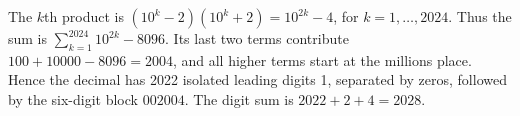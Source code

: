 The $k$th product is $(10^k-2)(10^k+2)=10^{2k}-4$, for $k=1,\ldots,2024$. Thus the sum is $\sum_{k=1}^{2024}10^{2k}-8096$. Its last two terms contribute $100+10000-8096=2004$, and all higher terms start at the millions place. Hence the decimal has 2022 isolated leading digits 1, separated by zeros, followed by the six-digit block $002004$. The digit sum is $2022+2+4=\boxed{2028}$.
